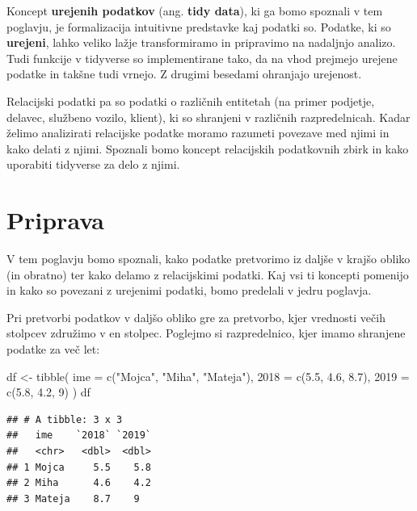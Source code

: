 \documentclass[
]{book}
\newenvironment{Shaded}{\begin{snugshade}}{\end{snugshade}}
\newcommand{\AttributeTok}[1]{\textcolor[rgb]{0.77,0.63,0.00}{#1}}
\newcommand{\DecValTok}[1]{\textcolor[rgb]{0.00,0.00,0.81}{#1}}
\newcommand{\FloatTok}[1]{\textcolor[rgb]{0.00,0.00,0.81}{#1}}
\newcommand{\FunctionTok}[1]{\textcolor[rgb]{0.00,0.00,0.00}{#1}}
\newcommand{\NormalTok}[1]{#1}
\newcommand{\OtherTok}[1]{\textcolor[rgb]{0.56,0.35,0.01}{#1}}
\newcommand{\StringTok}[1]{\textcolor[rgb]{0.31,0.60,0.02}{#1}}
\begin{document}
Koncept \textbf{urejenih podatkov} (ang. \textbf{tidy data}), ki ga bomo spoznali v tem poglavju, je formalizacija intuitivne predstavke kaj podatki so. Podatke, ki so \textbf{urejeni}, lahko veliko lažje transformiramo in pripravimo na nadaljnjo analizo. Tudi funkcije v tidyverse so implementirane tako, da na vhod prejmejo urejene podatke in takšne tudi vrnejo. Z drugimi besedami ohranjajo urejenost.

Relacijski podatki pa so podatki o različnih entitetah (na primer podjetje, delavec, službeno vozilo, klient), ki so shranjeni v različnih razpredelnicah. Kadar želimo analizirati relacijske podatke moramo razumeti povezave med njimi in kako delati z njimi. Spoznali bomo koncept relacijskih podatkovnih zbirk in kako uporabiti tidyverse za delo z njimi.

\hypertarget{priprava-1}{%
\section{Priprava}\label{priprava-1}}

V tem poglavju bomo spoznali, kako podatke pretvorimo iz daljše v krajšo obliko (in obratno) ter kako delamo z relacijskimi podatki. Kaj vsi ti koncepti pomenijo in kako so povezani z urejenimi podatki, bomo predelali v jedru poglavja.

Pri pretvorbi podatkov v daljšo obliko gre za pretvorbo, kjer vrednosti večih stolpcev združimo v en stolpec. Poglejmo si razpredelnico, kjer imamo shranjene podatke za več let:

\begin{Shaded}
\begin{Highlighting}[]
\NormalTok{df }\OtherTok{\textless{}{-}} \FunctionTok{tibble}\NormalTok{(}
  \AttributeTok{ime =} \FunctionTok{c}\NormalTok{(}\StringTok{"Mojca"}\NormalTok{, }\StringTok{"Miha"}\NormalTok{, }\StringTok{"Mateja"}\NormalTok{),}
  \StringTok{\textasciigrave{}}\AttributeTok{2018}\StringTok{\textasciigrave{}} \OtherTok{=} \FunctionTok{c}\NormalTok{(}\FloatTok{5.5}\NormalTok{, }\FloatTok{4.6}\NormalTok{, }\FloatTok{8.7}\NormalTok{),}
  \StringTok{\textasciigrave{}}\AttributeTok{2019}\StringTok{\textasciigrave{}} \OtherTok{=} \FunctionTok{c}\NormalTok{(}\FloatTok{5.8}\NormalTok{, }\FloatTok{4.2}\NormalTok{, }\DecValTok{9}\NormalTok{)}
\NormalTok{)}
\NormalTok{df}
\end{Highlighting}
\end{Shaded}

\begin{verbatim}
## # A tibble: 3 x 3
##   ime    `2018` `2019`
##   <chr>   <dbl>  <dbl>
## 1 Mojca     5.5    5.8
## 2 Miha      4.6    4.2
## 3 Mateja    8.7    9
\end{verbatim}
\end{document}
